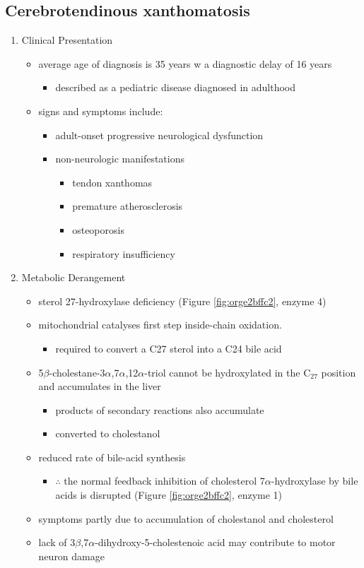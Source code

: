 \documentclass{scrartcl}
\begin{document}
\subsection{Cerebrotendinous xanthomatosis}
\label{sec:orgdb5e742}
\begin{enumerate}
\item Clinical Presentation
\label{sec:org14efa9e}
\begin{itemize}
\item average age of diagnosis is 35 years w a diagnostic delay of 16 years
\begin{itemize}
\item described as a pediatric disease diagnosed in adulthood
\end{itemize}
\item signs and symptoms include:
\begin{itemize}
\item adult-onset progressive neurological dysfunction
\item non-neurologic manifestations
\begin{itemize}
\item tendon xanthomas
\item premature atherosclerosis
\item osteoporosis
\item respiratory insufficiency
\end{itemize}
\end{itemize}
\end{itemize}

\item Metabolic Derangement
\label{sec:org3622b83}
\begin{itemize}
\item sterol 27-hydroxylase deficiency (Figure \ref{fig:orge2bffc2}, enzyme 4)
\item mitochondrial catalyses first step inside-chain oxidation.
\begin{itemize}
\item required to convert a C27 sterol into a C24 bile acid
\end{itemize}
\item 5\(\beta\)-cholestane-3\(\alpha\),7\(\alpha\),12\(\alpha\)-triol cannot be hydroxylated in the C\(_{\text{27}}\)
position and accumulates in the liver
\begin{itemize}
\item products of secondary reactions also accumulate
\item converted to cholestanol
\end{itemize}
\item reduced rate of bile-acid synthesis
\begin{itemize}
\item \(\therefore\) the normal feedback inhibition of cholesterol
7\(\alpha\)-hydroxylase by bile acids is disrupted (Figure \ref{fig:orge2bffc2}, enzyme 1)
\end{itemize}
\item symptoms partly due to accumulation of cholestanol and cholesterol
\item lack of 3\(\beta\),7\(\alpha\)-dihydroxy-5-cholestenoic acid may contribute to motor
neuron damage
\end{itemize}


\end{enumerate}
\end{document}
